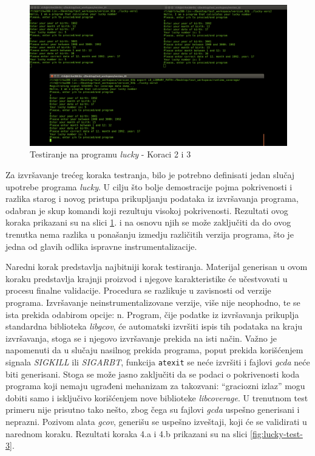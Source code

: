 \documentclass[12pt,oneside]{memoir}
\newcommand{\kod}[1]{\texttt{#1}}
\newcommand{\strano}[1]{\textit{#1}}
\begin{document}
\begin{figure}[!ht]
  \centering
  \includegraphics[width=\textwidth]{img/lucky2.png}
  \caption{Testiranje na programu \strano{lucky} - Koraci 2 i 3}
  \label{fig:lucky-test-2}
\end{figure}

Za izvršavanje trećeg koraka testranja, bilo je potrebno definisati jedan slučaj upotrebe programa \strano{lucky}. U cilju što bolje demostracije pojma pokrivenosti i razlika starog i novog pristupa prikupljanju podataka iz izvršavanja programa, odabran je skup komandi koji rezultuju visokoj pokrivenosti. Rezultati ovog koraka prikazani su na slici \ref{fig:lucky-test-2}. i na osnovu njih se može zaključiti da do ovog trenutka nema razlika u ponašanju izmedju različitih verzija programa, što je jedna od glavih odlika ispravne instrumentalizacije. 

Naredni korak predstavlja najbitniji korak testiranja. Materijal generisan u ovom koraku predstavlja krajnji proizvod i njegove karakteristike će učestvovati u procesu finalne validacije. Procedura se razlikuje u zavisnosti od verzije programa. Izvršavanje neinstrumentalizovane verzije, više nije neophodno, te se ista prekida odabirom opcije: n. Program, čije podatke iz izvršavanja prikuplja standardna biblioteka \strano{libgcov}, će automatski izvršiti ispis tih podataka na kraju izvršavanja, stoga se i njegovo izvršavanje prekida na isti način. Važno je napomenuti da u slučaju nasilnog prekida programa, poput prekida korišćenjem signala \strano{SIGKILL} ili \strano{SIGARBT}, funkcija \kod{atexit} se neće izvršiti i fajlovi \strano{gcda} neće biti generisani. Stoga se može jasno zaključiti da se podaci o pokrivenosti koda programa koji nemaju ugrađeni mehanizam za takozvani: “graciozni izlaz” mogu dobiti samo i isključivo korišćenjem nove biblioteke \strano{libcoverage}. U trenutnom test primeru nije prisutno tako nešto, zbog čega su fajlovi \strano{gcda} uspešno generisani i neprazni. Pozivom alata \strano{gcov}, generišu se uspešno izveštaji, koji će se validirati u narednom koraku. Rezultati koraka 4.a i 4.b prikazani su na slici \ref{fig:lucky-test-3}.
\end{document}
